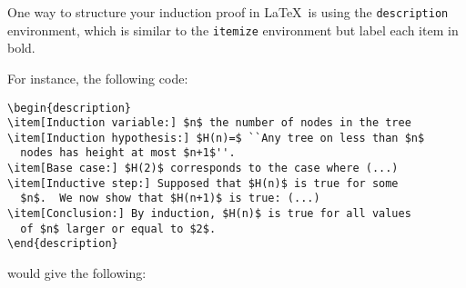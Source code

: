 \begin{codeExample}
  One way to structure your induction proof in \LaTeX\ is using the
  \verb+description+ environment, which is similar to the
  \verb+itemize+ environment but label each item in bold.

 \pagebreak[3]
  For instance, the following code:
\begin{verbatim}
\begin{description}
\item[Induction variable:] $n$ the number of nodes in the tree
\item[Induction hypothesis:] $H(n)=$ ``Any tree on less than $n$
  nodes has height at most $n+1$''.
\item[Base case:] $H(2)$ corresponds to the case where (...)
\item[Inductive step:] Supposed that $H(n)$ is true for some
  $n$.  We now show that $H(n+1)$ is true: (...)
\item[Conclusion:] By induction, $H(n)$ is true for all values
  of $n$ larger or equal to $2$.
\end{description}
\end{verbatim}
would give the following:
\begin{center}
  \end{center}
\end{codeExample}
